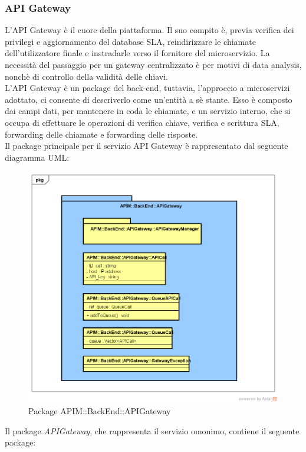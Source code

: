 \subsubsection{API Gateway}

L'API Gateway è il cuore della piattaforma. Il suo compito è, previa verifica dei privilegi e aggiornamento del database SLA, reindirizzare le chiamate dell'utilizzatore finale e instradarle verso il fornitore del microservizio. La necessità del passaggio per un gateway centralizzato è per motivi di data analysis, nonchè di controllo della validità delle chiavi. \\
L'API Gateway è un package del back-end, tuttavia, l'approccio a microservizi adottato, ci consente di descriverlo come un'entità a sè stante. Esso è composto dai campi dati, per mantenere in coda le chiamate, e un servizio interno, che si occupa di effettuare le operazioni di verifica chiave, verifica e scrittura SLA, forwarding delle chiamate e forwarding delle risposte.  \\
Il package principale per il servizio API Gateway è rappresentato dal seguente diagramma UML:

\begin{figure}[H]
	\centering
	\includegraphics[scale=0.45]{UML/DiagrammiPackage/APIGateway.png}
	\caption{Package APIM::BackEnd::APIGateway}
\end{figure}


Il package \textit{APIGateway}, che rappresenta il servizio omonimo, contiene il seguente package:

